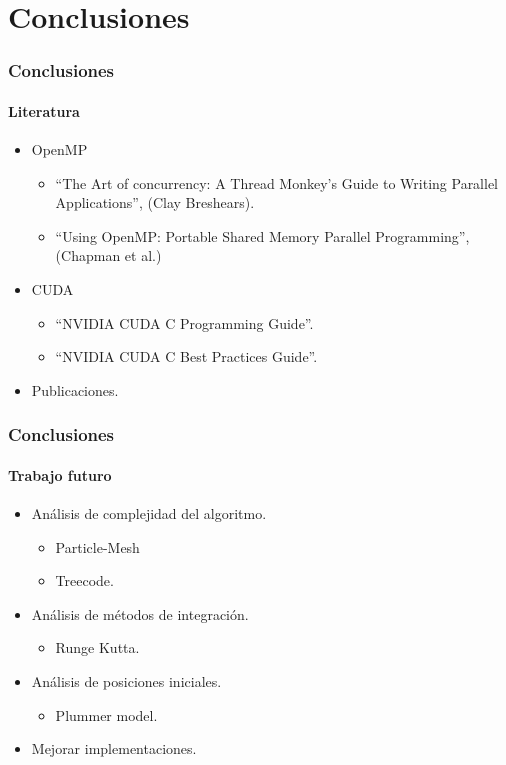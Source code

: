 \section{Conclusiones}
\frame
{
\frametitle{Conclusiones}
\framesubtitle{Literatura}
\begin{itemize}
	\item OpenMP
	\begin{itemize}
		\item ``The Art of concurrency: A Thread Monkey's Guide to Writing Parallel Applications'', (Clay Breshears).
		\item ``Using OpenMP: Portable Shared Memory Parallel Programming'', (Chapman et al.)
	\end{itemize}
	\item CUDA
	\begin{itemize}
		\item ``NVIDIA CUDA C Programming Guide''.
		\item ``NVIDIA CUDA C Best Practices Guide''.
	\end{itemize}
	\item Publicaciones.
\end{itemize}
}

\frame
{
\frametitle{Conclusiones}
\framesubtitle{Trabajo futuro}
\begin{itemize}
	\item Análisis de complejidad del algoritmo.
	\begin{itemize}
		\item Particle-Mesh
		\item Treecode.
	\end{itemize}
	\item Análisis de métodos de integración.
	\begin{itemize}
		\item Runge Kutta.
	\end{itemize}
	\item Análisis de posiciones iniciales.
	\begin{itemize}
		\item Plummer model.
	\end{itemize}
	\item Mejorar implementaciones.
\end{itemize}
}
